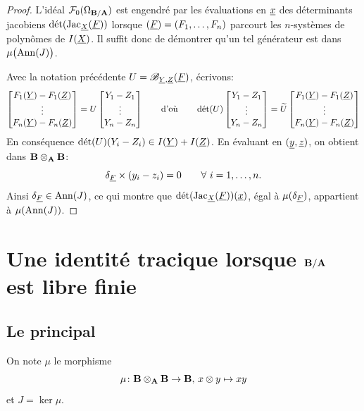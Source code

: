 \documentclass[12pt,twoside,a4paper]{article}
\begin{document}
\begin {proof} 

L'idéal ${\cal F}_0(\Omega_{\mathbf{B}/\mathbf{A}})$ est engendré par les évaluations en ${\underline{x}}$
des déterminants jacobiens $\mathop{\mathrm{d\acute{e}t}}\nolimits(\mathrm{Jac}_{\underline{X}}({\underline{F}}))$ lorsque $({\underline{F}}) =
(F_1, \dots, F_n)$ parcourt les $n$-systèmes de polynômes de $I({\underline{X}})$.
Il suffit donc de démontrer qu'un tel générateur est dans
$\mu\big(\mathrm{Ann}(J)\big)$.

Avec la notation précédente $U = \mathscr{B}_{{\underline{Y}},{\underline{Z}}}({\underline{F}})$, écrivons:
$$
\begin {bmatrix} F_1({\underline{Y}})-F_1({\underline{Z}})\\\vdots\\ F_n({\underline{Y}})-F_n({\underline{Z}}) \end {bmatrix}
= U
\begin {bmatrix} Y_1-Z_1\\\vdots\\ Y_n-Z_n \end {bmatrix}
\qquad \text{d'où} \qquad
\mathop{\mathrm{d\acute{e}t}}\nolimits(U) \begin {bmatrix} Y_1-Z_1\\\vdots\\ Y_n-Z_n \end {bmatrix} =
\widetilde {U}
\begin {bmatrix} F_1({\underline{Y}})-F_1({\underline{Z}})\\\vdots\\ F_n({\underline{Y}})-F_n({\underline{Z}}) \end {bmatrix}
$$
En conséquence $\mathop{\mathrm{d\acute{e}t}}\nolimits(U)(Y_i-Z_i) \in I({\underline{Y}}) + I({\underline{Z}})$. En évaluant
en $({\underline{y}},{\underline{z}})$, on obtient dans $\mathbf{B}\otimes_{\mathbf{A}}\mathbf{B}$:
$$
\delta_\uF \times (y_i-z_i) = 0  \qquad \forall\ i=1, \dots, n.
$$
Ainsi $\delta_{\underline{F}} \in \mathrm{Ann}(J)$, ce qui montre que $\mathop{\mathrm{d\acute{e}t}}\nolimits(\mathrm{Jac}_{\underline{X}}({\underline{F}}))({\underline{x}})$, égal à
$\mu(\delta_{\underline{F}})$, appartient à $\mu(\mathrm{Ann}(J))$.
\end {proof}


\section{Une identité tracique lorsque $\mathbf{B}/\mathbf{A}$ est libre finie}

\subsection{Le \tho principal}
On note $\mu$ le morphisme  
\[
\mu \colon \mathbf{B}\otimes_{\mathbf{A}}\mathbf{B} \to \mathbf{B},\,x\otimes y\mapsto xy
\]
 et $J=\ker\mu$. 
\end{document}
